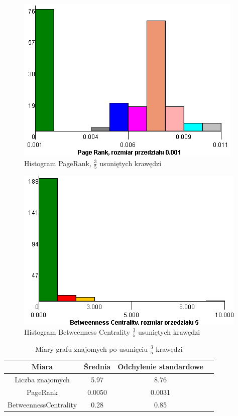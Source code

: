 \documentclass[10pt,a4paper]{article}
\begin{document}
\begin{figure}[H]
\centering
\caption{Histogram PageRank, $\frac{3}{5}$ usuniętych krawędzi}
\includegraphics[scale=0.6]{wyniki/final200Friends/3200friendsPRHist.png}
\end{figure}


\begin{figure}[H]
\centering
\caption{Histogram Betweenness Centrality $\frac{3}{5}$ usuniętych krawędzi}
\includegraphics[scale=0.6]{wyniki/final200Friends/3200friendsBCHist.png}
\end{figure}

\begin{table}[H]
  \caption{Miary grafu znajomych po usunięciu  $\frac{3}{5}$ krawędzi}
  \centering
    \begin{tabular}{cccc}
    \addlinespace
    \toprule
    Miara & Średnia  & Odchylenie standardowe \\
    \midrule
    Liczba znajomych & 5.97 & 8.76 \\
    PageRank & 0.0050 & 0.0031 \\
    BetweennessCentrality & 0.28 & 0.85\\ 
    \bottomrule
    \end{tabular}
  \label{tab:addlabel}
\end{table}
\end{document}
